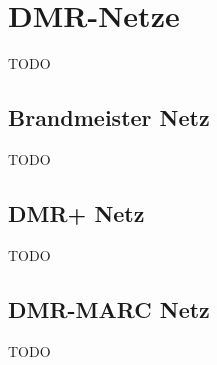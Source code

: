\section{DMR-Netze} \label{sec:netze}
TODO

\subsection{Brandmeister Netz}
TODO

\subsection{DMR+ Netz}
TODO

\subsection{DMR-MARC Netz}
TODO